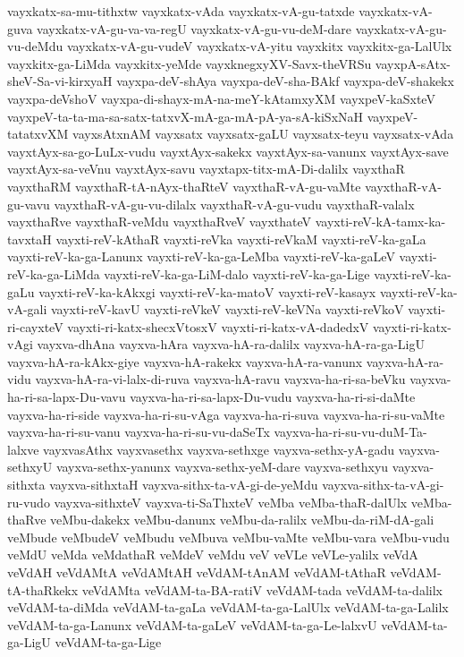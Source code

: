 {vayxkatx-sa-mu-tithxtw
vayxkatx-vAda
vayxkatx-vA-gu-tatxde
vayxkatx-vA-guva
vayxkatx-vA-gu-va-va-regU
vayxkatx-vA-gu-vu-deM-dare
vayxkatx-vA-gu-vu-deMdu
vayxkatx-vA-gu-vudeV
vayxkatx-vA-yitu
vayxkitx
vayxkitx-ga-LalUlx
vayxkitx-ga-LiMda
vayxkitx-yeMde
vayxknegxyXV-Savx-theVRSu
vayxpA-sAtx-sheV-Sa-vi-kirxyaH
vayxpa-deV-shAya
vayxpa-deV-sha-BAkf
vayxpa-deV-shakekx
vayxpa-deVshoV
vayxpa-di-shayx-mA-na-meY-kAtamxyXM
vayxpeV-kaSxteV
vayxpeV-ta-ta-ma-sa-satx-tatxvX-mA-ga-mA-pA-ya-sA-kiSxNaH
vayxpeV-tatatxvXM
vayxsAtxnAM
vayxsatx
vayxsatx-gaLU
vayxsatx-teyu
vayxsatx-vAda
vayxtAyx-sa-go-LuLx-vudu
vayxtAyx-sakekx
vayxtAyx-sa-vanunx
vayxtAyx-save
vayxtAyx-sa-veVnu
vayxtAyx-savu
vayxtapx-titx-mA-Di-dalilx
vayxthaR
vayxthaRM
vayxthaR-tA-nAyx-thaRteV
vayxthaR-vA-gu-vaMte
vayxthaR-vA-gu-vavu
vayxthaR-vA-gu-vu-dilalx
vayxthaR-vA-gu-vudu
vayxthaR-valalx
vayxthaRve
vayxthaR-veMdu
vayxthaRveV
vayxthateV
vayxti-reV-kA-tamx-ka-tavxtaH
vayxti-reV-kAthaR
vayxti-reVka
vayxti-reVkaM
vayxti-reV-ka-gaLa
vayxti-reV-ka-ga-Lanunx
vayxti-reV-ka-ga-LeMba
vayxti-reV-ka-gaLeV
vayxti-reV-ka-ga-LiMda
vayxti-reV-ka-ga-LiM-dalo
vayxti-reV-ka-ga-Lige
vayxti-reV-ka-gaLu
vayxti-reV-ka-kAkxgi
vayxti-reV-ka-matoV
vayxti-reV-kasayx
vayxti-reV-ka-vA-gali
vayxti-reV-kavU
vayxti-reVkeV
vayxti-reV-keVNa
vayxti-reVkoV
vayxti-ri-cayxteV
vayxti-ri-katx-shecxVtosxV
vayxti-ri-katx-vA-dadedxV
vayxti-ri-katx-vAgi
vayxva-dhAna
vayxva-hAra
vayxva-hA-ra-dalilx
vayxva-hA-ra-ga-LigU
vayxva-hA-ra-kAkx-giye
vayxva-hA-rakekx
vayxva-hA-ra-vanunx
vayxva-hA-ra-vidu
vayxva-hA-ra-vi-lalx-di-ruva
vayxva-hA-ravu
vayxva-ha-ri-sa-beVku
vayxva-ha-ri-sa-lapx-Du-vavu
vayxva-ha-ri-sa-lapx-Du-vudu
vayxva-ha-ri-si-daMte
vayxva-ha-ri-side
vayxva-ha-ri-su-vAga
vayxva-ha-ri-suva
vayxva-ha-ri-su-vaMte
vayxva-ha-ri-su-vanu
vayxva-ha-ri-su-vu-daSeTx
vayxva-ha-ri-su-vu-duM-Ta-lalxve
vayxvasAthx
vayxvasethx
vayxva-sethxge
vayxva-sethx-yA-gadu
vayxva-sethxyU
vayxva-sethx-yanunx
vayxva-sethx-yeM-dare
vayxva-sethxyu
vayxva-sithxta
vayxva-sithxtaH
vayxva-sithx-ta-vA-gi-de-yeMdu
vayxva-sithx-ta-vA-gi-ru-vudo
vayxva-sithxteV
vayxva-ti-SaThxteV
veMba
veMba-thaR-dalUlx
veMba-thaRve
veMbu-dakekx
veMbu-danunx
veMbu-da-ralilx
veMbu-da-riM-dA-gali
veMbude
veMbudeV
veMbudu
veMbuva
veMbu-vaMte
veMbu-vara
veMbu-vudu
veMdU
veMda
veMdathaR
veMdeV
veMdu
veV
veVLe
veVLe-yalilx
veVdA
veVdAH
veVdAMtA
veVdAMtAH
veVdAM-tAnAM
veVdAM-tAthaR
veVdAM-tA-thaRkekx
veVdAMta
veVdAM-ta-BA-ratiV
veVdAM-tada
veVdAM-ta-dalilx
veVdAM-ta-diMda
veVdAM-ta-gaLa
veVdAM-ta-ga-LalUlx
veVdAM-ta-ga-Lalilx
veVdAM-ta-ga-Lanunx
veVdAM-ta-gaLeV
veVdAM-ta-ga-Le-lalxvU
veVdAM-ta-ga-LigU
veVdAM-ta-ga-Lige
}
